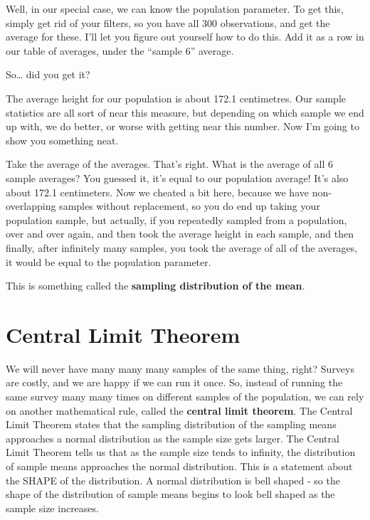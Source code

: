 \documentclass[
]{book}
\begin{document}
Well, in our special case, we can know the population parameter. To get this, simply get rid of your filters, so you have all 300 observations, and get the average for these. I'll let you figure out yourself how to do this. Add it as a row in our table of averages, under the ``sample 6'' average.

So\ldots{} did you get it?

The average height for our population is about 172.1 centimetres. Our sample statistics are all sort of near this measure, but depending on which sample we end up with, we do better, or worse with getting near this number. Now I'm going to show you something neat.

Take the average of the averages. That's right. What is the average of all 6 sample averages? You guessed it, it's equal to our population average! It's also about 172.1 centimeters. Now we cheated a bit here, because we have non-overlapping samples without replacement, so you do end up taking your population sample, but actually, if you repeatedly sampled from a population, over and over again, and then took the average height in each sample, and then finally, after infinitely many samples, you took the average of all of the averages, it would be equal to the population parameter.

This is something called the \textbf{sampling distribution of the mean}.

\hypertarget{central-limit-theorem}{%
\section{Central Limit Theorem}\label{central-limit-theorem}}

We will never have many many many samples of the same thing, right? Surveys are costly, and we are happy if we can run it once. So, instead of running the same survey many many times on different samples of the population, we can rely on another mathematical rule, called the \textbf{central limit theorem}. The Central Limit Theorem states that the sampling distribution of the sampling means approaches a normal distribution as the sample size gets larger. The Central Limit Theorem tells us that as the sample size tends to infinity, the distribution of sample means approaches the normal distribution. This is a statement about the SHAPE of the distribution. A normal distribution is bell shaped - so the shape of the distribution of sample means begins to look bell shaped as the sample size increases.
\end{document}
